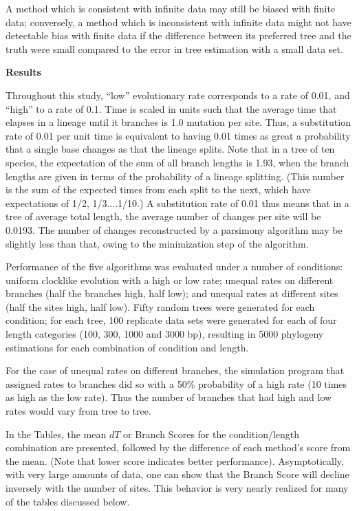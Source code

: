 A method which is consistent with infinite data may still be biased
with finite data; conversely, a method which is inconsistent with
infinite data might not have detectable bias with finite data if the
difference between its preferred tree and the truth were small compared
to the error in tree estimation with a small data set.


\newpage
\noindent
{\bf Results}
\bigskip


	Throughout this study, ``low'' evolutionary rate corresponds to 
a rate of 0.01, and ``high'' to a rate of 0.1.  Time is scaled in units 
such that the average time that elapses in a lineage until it branches 
is 1.0 mutation per site.  Thus, a substitution rate of 0.01 per unit time 
is equivalent to 
having 0.01 times as great a probability that a single base changes 
as that the lineage splits.  Note that in a tree of ten species, the 
expectation of the sum of all branch lengths is 1.93, when the
branch lengths are given in terms of the probability of a lineage splitting.
(This number is the sum of the expected times from each split to the
next, which have expectations of 1/2, 1/3....1/10.)
A substitution rate of 0.01 thus means that in a tree of average total length, 
the average number of changes per site will be 0.0193.  The number of
changes reconstructed by a parsimony algorithm may be slightly less than
that, owing to the minimization step of the algorithm.

	Performance of the five algorithms was evaluated under a 
number of conditions:  uniform clocklike evolution with a high or low 
rate; unequal rates on different branches (half the branches high, 
half low); and unequal rates at different sites (half the sites high, 
half low).  Fifty random trees were generated for each condition; for 
each tree, 100 replicate data sets were generated for each of four 
length categories (100, 300, 1000 and 3000 bp), resulting in 5000 
phylogeny estimations for each combination of condition and length.

        For the case of unequal rates on different branches, the simulation
program that assigned rates to branches did so with a 50\% probability of
a high rate (10 times as high as the low rate).  Thus the number of
branches that had high and low rates would vary from tree to tree.

	In the Tables, the mean $dT$ or Branch Scores for the 
condition/length combination are presented, followed by the 
difference of each method's score from the mean.  (Note that lower 
score indicates better performance).  Asymptotically, with very large
amounts of data, one can show that the Branch Score will decline
inversely with the number of sites.  This behavior is very nearly
realized for many of the tables discussed below.

